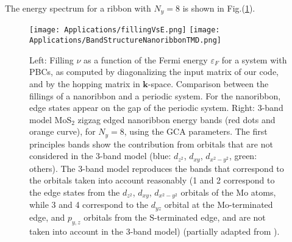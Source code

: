 The energy spectrum for a ribbon with $N_y = 8$ is shown in Fig.(\ref{fig:fillingVsE}).
\begin{figure}[H]
\texttt{[image: Applications/fillingVsE.png]}
\texttt{[image: Applications/BandStructureNanoribbonTMD.png]}
	\caption[Filling $\nu$ as a function of the Fermi energy $\varepsilon_F$ for a \acs{TMD} monolayer and a nanoribbon. $\text{Mo}\text{S}_2$.  \acs{TMDNR} band structure obtained by the 3-band model.]{Left: Filling $\nu$ as a function of the Fermi energy $\varepsilon_F$ for a system with \acp{PBC}, as computed by diagonalizing the input matrix of our code, and by the hopping matrix in $\bm k$-space. Comparison between the fillings of a nanoribbon and a periodic system.
	For the nanoribbon, edge states appear on the gap of the periodic system.
	Right: 3-band model $\text{Mo}\text{S}_2$ zigzag edged nanoribbon energy bands (red dots and orange curve), for $N_y = 8$, using the GCA parameters. The first principles bands show the contribution from orbitals that are not considered in the 3-band model (blue:  $d_{z^2}$, $d_{xy}$, $d_{x^2-y^2}$, green: others). The 3-band model reproduces the bands that correspond to the orbitals taken into account reasonably (1 and 2 correspond to the edge states from the $d_{z^2}$, $d_{xy}$, $d_{x^2-y^2}$ orbitals of the $\text{Mo}$ atoms, while 3 and 4 correspond to the $d_{yz}$ orbital at the $\text{Mo}$-terminated edge, and $p_{y, z}$ orbitals from the $\text{S}$-terminated edge, and are not taken into account in the 3-band model) (partially adapted from \cite{liu_three-band_2013}).}
	\label{fig:fillingVsE}
\end{figure}

